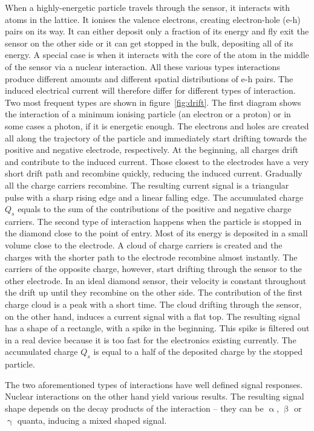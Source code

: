 \documentclass[twoside,12pt]{packages/mytustyle}  %
\begin{document}
\begin{figure}[!t]
\end{figure}When a highly-energetic particle travels through the sensor, it interacts with atoms in the lattice. It ionises the valence electrons, creating electron-hole (e-h) pairs on its way. It can either deposit only a fraction of its energy and fly exit the sensor on the other side or it can get stopped in the bulk, depositing all of its energy. A special case is when it interacts with the core of the atom in the middle of the sensor via a nuclear interaction. All these various types interactions produce different amounts and different spatial distributions of e-h pairs. The induced electrical current will therefore differ for different types of interaction. Two most frequent types are shown in figure~\ref{fig:drift}. The first diagram shows the interaction of a minimum ionising particle (an electron or a proton) or in some cases a photon, if it is energetic enough. The electrons and holes are created all along the trajectory of the particle and immediately start drifting towards the positive and negative electrode, respectively. At the beginning, all charges drift and contribute to the induced current. Those closest to the electrodes have a very short drift path and recombine quickly, reducing the induced current. Gradually all the charge carriers recombine. The resulting current signal is a triangular pulse with a sharp rising edge and a linear falling edge. The accumulated charge $Q_s$ equals to the sum of the contributions of the positive and negative charge carriers. The second type of interaction happens when the particle is stopped in the diamond close to the point of entry. Most of its energy is deposited in a small volume close to the electrode. A cloud of charge carriers is created and the charges with the shorter path to the electrode recombine almost instantly. The carriers of the opposite charge, however, start drifting through the sensor to the other electrode. In an ideal diamond sensor, their velocity is constant throughout the drift up until they recombine on the other side. The contribution of the first charge cloud is a peak with a short time. The cloud drifting through the sensor, on the other hand, induces a current signal with a flat top. The resulting signal has a shape of a rectangle, with a spike in the beginning. This spike is filtered out in a real device because it is too fast for the electronics existing currently. The accumulated charge $Q_s$ is equal to a half of the deposited charge by the stopped particle.

The two aforementioned types of interactions have well defined signal responses. Nuclear interactions on the other hand yield various results. The resulting signal shape depends on the decay products of the interaction -- they can be $\upalpha$, $\upbeta$ or $\upgamma$ quanta, inducing a mixed shaped signal. 
%
\end{document}
